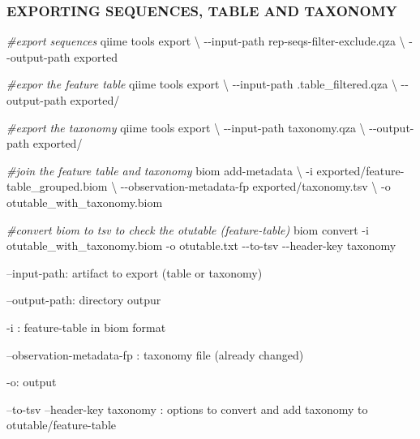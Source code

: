 \documentclass[]{interact}
\theoremstyle{plain}%
\theoremstyle{definition}
\theoremstyle{remark}
\newenvironment{Shaded}{\begin{snugshade}}{\end{snugshade}}
\newcommand{\AttributeTok}[1]{\textcolor[rgb]{0.77,0.63,0.00}{#1}}
\newcommand{\CommentTok}[1]{\textcolor[rgb]{0.56,0.35,0.01}{\textit{#1}}}
\newcommand{\DataTypeTok}[1]{\textcolor[rgb]{0.13,0.29,0.53}{#1}}
\newcommand{\ExtensionTok}[1]{#1}
\newcommand{\NormalTok}[1]{#1}
\begin{document}
\hypertarget{exporting-sequences-table-and-taxonomy}{%
\subsubsection{EXPORTING SEQUENCES, TABLE AND
TAXONOMY}\label{exporting-sequences-table-and-taxonomy}}

\begin{Shaded}
\begin{Highlighting}[]
\CommentTok{\#export sequences}
\ExtensionTok{qiime}\NormalTok{ tools export }\DataTypeTok{\textbackslash{}}
\NormalTok{{-}{-}input{-}path rep{-}seqs{-}filter{-}exclude.qza }\DataTypeTok{\textbackslash{}}
\NormalTok{{-}{-}output{-}path exported}

\CommentTok{\#expor the feature table}
\ExtensionTok{qiime}\NormalTok{ tools export }\DataTypeTok{\textbackslash{}}
\NormalTok{{-}{-}input{-}path .table\_filtered.qza }\DataTypeTok{\textbackslash{}}
\NormalTok{{-}{-}output{-}path exported/}

\CommentTok{\#export the taxonomy}
\ExtensionTok{qiime}\NormalTok{ tools export }\DataTypeTok{\textbackslash{}}
\NormalTok{{-}{-}input{-}path taxonomy.qza }\DataTypeTok{\textbackslash{}}
\NormalTok{{-}{-}output{-}path exported/}

\CommentTok{\#join the feature table and taxonomy}
\ExtensionTok{biom}\NormalTok{ add{-}metadata }\DataTypeTok{\textbackslash{}}
\NormalTok{{-}i exported/feature{-}table\_grouped.biom }\DataTypeTok{\textbackslash{}}
\NormalTok{{-}{-}observation{-}metadata{-}fp  exported/taxonomy.tsv }\DataTypeTok{\textbackslash{}}
\NormalTok{{-}o otutable\_with\_taxonomy.biom}

\CommentTok{\#convert biom to tsv to check the otutable (feature{-}table)}
\ExtensionTok{biom}\NormalTok{ convert }\AttributeTok{{-}i}\NormalTok{ otutable\_with\_taxonomy.biom}
\ExtensionTok{{-}o}\NormalTok{ otutable.txt }\AttributeTok{{-}{-}to{-}tsv} \AttributeTok{{-}{-}header{-}key}\NormalTok{ taxonomy}
\end{Highlighting}
\end{Shaded}

--input-path: artifact to export (table or taxonomy)

--output-path: directory outpur

-i : feature-table in biom format

--observation-metadata-fp : taxonomy file (already changed)

-o: output

--to-tsv --header-key taxonomy : options to convert and add taxonomy to
otutable/feature-table
\end{document}
